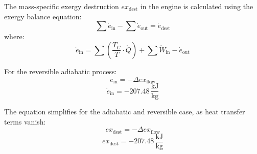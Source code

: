 The mass-specific exergy destruction \( ex_{\text{dest}} \) in the engine is calculated using the exergy balance equation:  
\[
\sum \dot{e}_{\text{in}} - \sum \dot{e}_{\text{out}} = \dot{e}_{\text{dest}}
\]
where:  
\[
\dot{e}_{\text{in}} = \sum \left( \frac{T_C}{T} \cdot \dot{Q} \right) + \sum \dot{W}_{\text{in}} - \dot{e}_{\text{out}}
\]

For the reversible adiabatic process:  
\[
\dot{e}_{\text{in}} = -\Delta ex_{\text{flow}}
\]
\[
\dot{e}_{\text{in}} = -207.48 \, \frac{\text{kJ}}{\text{kg}}
\]

The equation simplifies for the adiabatic and reversible case, as heat transfer terms vanish:  
\[
ex_{\text{dest}} = -\Delta ex_{\text{flow}}
\]
\[
ex_{\text{dest}} = -207.48 \, \frac{\text{kJ}}{\text{kg}}
\]